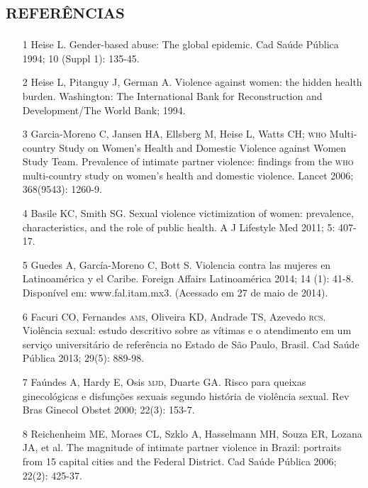 \documentclass{article}
\begin{document}
\section*{\textsc{referências}}
\begin{itemize}

\item[1] Heise L. Gender-based abuse: The global epidemic. Cad Saúde Pública
1994; 10 (Suppl 1): 135-45.

\item[2] Heise L, Pitanguy J, German A. Violence against women: the hidden
health burden. Washington: The International Bank for Reconstruction and
Development/The World Bank; 1994.

\item[3] Garcia-Moreno C, Jansen HA, Ellsberg M, Heise L, Watts CH; \textsc{who}
Multi-country Study on Women's Health and Domestic Violence against Women Study
Team. Prevalence of intimate partner violence: findings from the \textsc{who}
multi-country study on women's health and domestic violence. Lancet 2006;
368(9543): 1260-9.

\item[4] Basile KC, Smith SG. Sexual violence victimization of women:
prevalence, characteristics, and the role of public health. A J Lifestyle Med
2011; 5: 407-17.

\item[5] Guedes A, García-Moreno C, Bott S. Violencia contra las mujeres en
Latinoamérica y el Caribe. Foreign Affairs Latinoamérica 2014; 14 (1): 41-8.
Disponível em: www.fal.itam.mx3. (Acessado em 27 de maio de 2014).

\item[6] Facuri CO, Fernandes \textsc{ams}, Oliveira KD, Andrade TS, Azevedo \textsc{rcs}.
Violência sexual: estudo descritivo sobre as vítimas e o atendimento em um
serviço universitário de referência no Estado de São Paulo, Brasil. Cad Saúde
Pública 2013; 29(5): 889-98.

\item[7] Faúndes A, Hardy E, Osis \textsc{mjd}, Duarte GA. Risco para queixas
ginecológicas e disfunções sexuais segundo história de violência sexual. Rev
Bras Ginecol Obstet 2000; 22(3): 153-7.

\item[8] Reichenheim ME, Moraes CL, Szklo A, Hasselmann MH, Souza ER, Lozana
JA, et al. The magnitude of intimate partner violence in Brazil: portraits from
15 capital cities and the Federal District. Cad Saúde Pública 2006; 22(2):
425-37.


\end{itemize}
\end{document}

